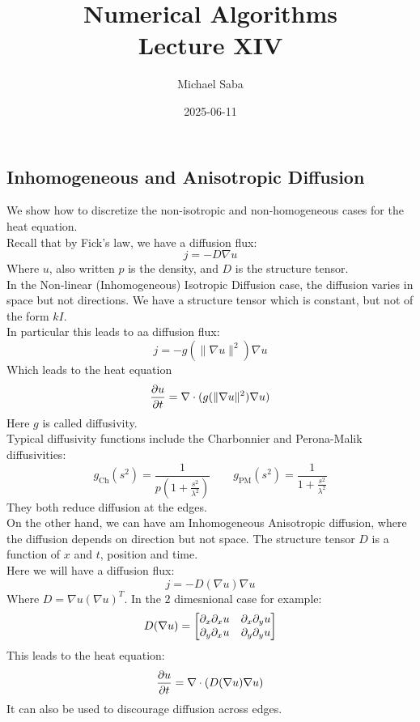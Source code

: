 \documentclass[12pt]{article}
\title{%
    \Huge Numerical Algorithms \\
    \Large Lecture XIV
}
\date{2025-06-11}
\author{Michael Saba}
\begin{document}
\maketitle
\newpage
\setlength{\parindent}{0pt}

\subsection*{Inhomogeneous and Anisotropic Diffusion}

We show how to discretize the
non-isotropic and non-homogeneous cases
for the heat equation. \\

Recall that by Fick's law, we have a diffusion flux:
\[ j = -D\nabla u \]
Where $u$, also written $p$ is the density, and $D$ is the
structure tensor. \\

In the Non-linear (Inhomogeneous) Isotropic Diffusion
case, the diffusion varies in space but not
directions. We have a structure tensor which
is constant, but not of the form $kI$. \\
In particular this leads to aa diffusion flux:
\[ j = -g(\|\nabla u\|^2)\nabla u \]
Which leads to the heat equation
\[ \dfrac{\partial u}{\partial t} = \nabla \cdot (g(\|\nabla u\|^2) 
\nabla u) \]
Here $g$ is called diffusivity. \\

Typical diffusivity functions include the Charbonnier 
and Perona-Malik diffusivities:
\[ g_{\text{Ch}}(s^2) = 
\frac{1}{p \left( 1 + \frac{s^2}{\lambda^2} \right)} 
\qquad g_{\text{PM}}(s^2) = 
\frac{1}{1 + \frac{s^2}{\lambda^2}} \]
They both reduce diffusion at the edges. \\

On the other hand, we can have am Inhomogeneous Anisotropic
diffusion, where the diffusion depends on direction
but not space. 
The structure tensor $D$ is a function of $x$ and $t$,
position and time. \\
Here we will have a diffusion flux:
\[ j = -D(\nabla u)\nabla u \]
Where $D = \nabla u (\nabla u)^T$. 
In the $2$ dimesnional case for example:
\[ D(\nabla u) = \begin{bmatrix} \partial_{x}\partial_{x} u 
& \partial_{x}\partial_{y}u \\
\partial_{y}\partial_{x}u &
\partial_{y}\partial_{y}u \end{bmatrix} \]
This leads to the heat equation:
\[ \dfrac{\partial u}{\partial t} = \nabla \cdot (D(\nabla u) \nabla u) \]
It can also be used to
discourage diffusion across edges. \\
\end{document}
